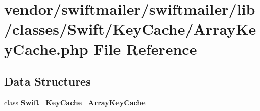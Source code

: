 \section{vendor/swiftmailer/swiftmailer/lib/classes/\+Swift/\+Key\+Cache/\+Array\+Key\+Cache.php File Reference}
\label{_array_key_cache_8php}
\subsection*{Data Structures}
\begin{DoxyCompactItemize}
\item 
class {\bf Swift\+\_\+\+Key\+Cache\+\_\+\+Array\+Key\+Cache}
\end{DoxyCompactItemize}
